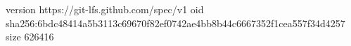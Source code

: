 version https://git-lfs.github.com/spec/v1
oid sha256:6bdc48414a5b3113c69670f82ef0742ae4bb8b44c6667352f1cea557f34d4257
size 626416
